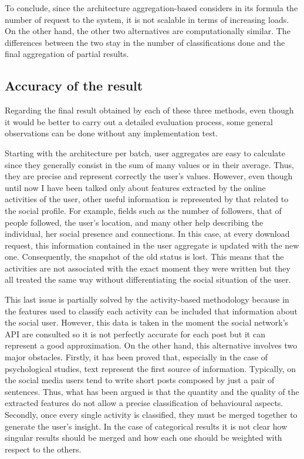 To conclude, since the architecture aggregation-based considers in its formula the number of request to the system, it is not scalable in terms of increasing loads.
On the other hand, the other two alternatives are computationally similar. The differences between the two stay in the number of classifications done and the final aggregation of partial results.

\subsection{Accuracy of the result}
Regarding the final result obtained by each of these three methods, even though it would be better to carry out a detailed evaluation process, some general observations can be done without any implementation test.

Starting with the architecture per batch, user aggregates are easy to calculate since they generally consist in the sum of many values or in their average. Thus, they are precise and represent correctly the user's values.
However, even though until now I have been talked only about features extracted by the online activities of the user, other useful information is represented by that related to the social profile. For example, fields such as the number of followers, that of people followed, the user's location, and many other help describing the individual, her social presence and connections.
In this case, at every download request, this information contained in the user aggregate is updated with the new one. Consequently, the snapshot of the old status is lost.
This means that the activities are not associated with the exact moment they were written but they all treated the same way without differentiating the social situation of the user.

This last issue is partially solved by the activity-based methodology because in the features used to classify each activity can be included that information about the social user.
However, this data is taken in the moment the social network's API are consulted so it is not perfectly accurate for each post but it can represent a good approximation.
On the other hand, this alternative involves two major obstacles. Firstly, it has been proved that, especially in the case of psychological studies, text represent the first source of information. Typically, on the social media users tend to write short posts composed by just a pair of sentences. 
Thus, what has been argued is that the quantity and the quality of the extracted features do not allow a precise classification of behavioural aspects.
Secondly, once every single activity is classified, they must be merged together to generate the user's insight.
In the case of categorical results it is not clear how singular results should be merged and how each one should be weighted with respect to the others.

